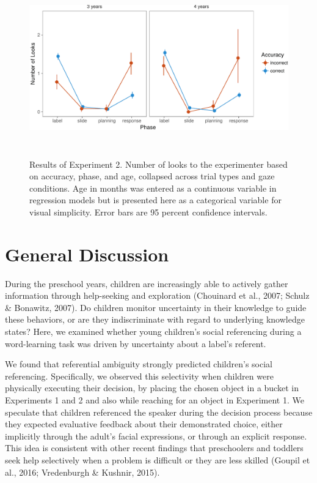 \documentclass[a4paper,man,apacite,floatsintext]{apa6}
\newenvironment{CodeChunk}{}{}
\begin{document}
\begin{CodeChunk}
\begin{figure}[b]

{\centering \includegraphics[width=6in,height=3in]{figs/acc_results_e2-1} 

}

\caption[Results of Experiment 2]{Results of Experiment 2. Number of looks to the experimenter based on accuracy, phase, and age, collapsed across trial types and gaze conditions. Age in months was entered as a continuous variable in regression models but is presented here as a categorical variable for visual simplicity. Error bars are 95 percent confidence intervals. }\label{fig:acc_results_e2}
\end{figure}
\end{CodeChunk}

\section{General Discussion}\label{general-discussion}

During the preschool years, children are increasingly able to actively
gather information through help-seeking and exploration (Chouinard et
al., 2007; Schulz \& Bonawitz, 2007). Do children monitor uncertainty in
their knowledge to guide these behaviors, or are they indiscriminate
with regard to underlying knowledge states? Here, we examined whether
young children's social referencing during a word-learning task was
driven by uncertainty about a label's referent.

We found that referential ambiguity strongly predicted children's social
referencing. Specifically, we observed this selectivity when children
were physically executing their decision, by placing the chosen object
in a bucket in Experiments 1 and 2 and also while reaching for an object
in Experiment 1. We speculate that children referenced the speaker
during the decision process because they expected evaluative feedback
about their demonstrated choice, either implicitly through the adult's
facial expressions, or through an explicit response. This idea is
consistent with other recent findings that preschoolers and toddlers
seek help selectively when a problem is difficult or they are less
skilled (Goupil et al., 2016; Vredenburgh \& Kushnir, 2015).
\end{document}
